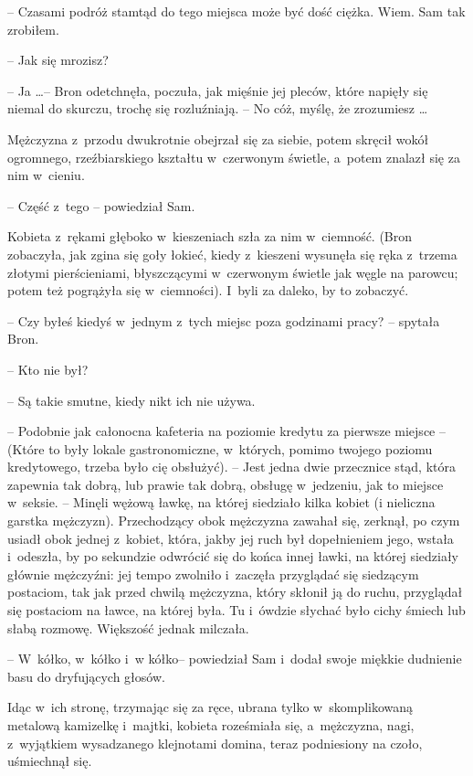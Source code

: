 \documentclass[oneside,polish,11pt,rmheadings]{mwbk}
\begin{document}
-- Czasami podróż stamtąd do tego miejsca może być dość ciężka. Wiem. Sam tak zrobiłem. 

-- Jak się mrozisz? 

-- Ja \ldots  -- Bron odetchnęła, poczuła, jak mięśnie jej pleców, które napięły się niemal do skurczu, trochę się rozluźniają. -- No cóż, myślę, że zrozumiesz \ldots  

Mężczyzna z~przodu dwukrotnie obejrzał się za siebie, potem skręcił wokół ogromnego, rzeźbiarskiego kształtu w~czerwonym świetle, a~potem znalazł się za nim w~cieniu. 

-- Część z~tego -- powiedział Sam. 

Kobieta z~rękami głęboko w~kieszeniach szła za nim w~ciemność. (Bron zobaczyła, jak zgina się goły łokieć, kiedy z~kieszeni wysunęła się ręka z~trzema złotymi pierścieniami, błyszczącymi w~czerwonym świetle jak węgle na parowcu; potem też pogrążyła się w~ciemności). I~byli za daleko, by to zobaczyć. 

-- Czy byłeś kiedyś w~jednym z~tych miejsc poza godzinami pracy? -- spytała Bron. 

-- Kto nie był? 

-- Są takie smutne, kiedy nikt ich nie używa.  

-- Podobnie jak całonocna kafeteria na poziomie kredytu za pierwsze miejsce -- (Które to były lokale gastronomiczne, w~których, pomimo twojego poziomu kredytowego, trzeba było cię obsłużyć).  -- Jest jedna dwie przecznice stąd, która zapewnia tak dobrą, lub prawie tak dobrą, obsługę w~jedzeniu, jak to miejsce w~seksie. -- Minęli wężową ławkę, na której siedziało kilka kobiet (i nieliczna garstka mężczyzn). Przechodzący obok mężczyzna zawahał się, zerknął, po czym usiadł obok jednej z~kobiet, która, jakby jej ruch był dopełnieniem jego, wstała i~odeszła, by po sekundzie odwrócić się do końca innej ławki, na której siedziały głównie mężczyźni: jej tempo zwolniło i~zaczęła przyglądać się siedzącym postaciom, tak jak przed chwilą mężczyzna, który skłonił ją do ruchu, przyglądał się postaciom na ławce, na której była. Tu i~ówdzie słychać było cichy śmiech lub słabą rozmowę. Większość jednak milczała. 

-- W~kółko, w~kółko i~w kółko-- powiedział Sam i~dodał swoje miękkie dudnienie basu do dryfujących głosów. 

Idąc w~ich stronę, trzymając się za ręce, ubrana tylko w~skomplikowaną metalową kamizelkę i~majtki, kobieta roześmiała się, a~mężczyzna, nagi, z~wyjątkiem wysadzanego klejnotami domina, teraz podniesiony na czoło, uśmiechnął się. 
\end{document}
